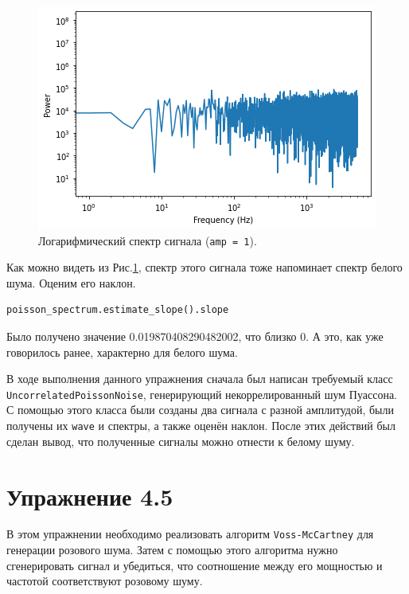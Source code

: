 \documentclass[a4paper, 14pt]{extarticle}
\begin{document}
    \begin{figure}[h]
        \centering
        \includegraphics[width=0.8\linewidth]{resources/Images/task4_large_spectrum_log}
        \caption{Логарифмический спектр сигнала (\texttt{amp = 1}).}
        \label{fig:task4_large_spectrum_log}
    \end{figure}

    Как можно видеть из Рис.\ref{fig:task4_large_spectrum_log}, спектр этого сигнала тоже напоминает спектр белого
    шума. Оценим его наклон.

    \begin{lstlisting}[caption= Вычисление наклона \texttt{(amp = 1)}., label={lst:task4_large_slope}]
poisson_spectrum.estimate_slope().slope \end{lstlisting}

    Было получено значение 0.019870408290482002, что близко 0. А это, как уже говорилось ранее, характерно для белого шума.

    В ходе выполнения данного упражнения сначала был написан требуемый класс \texttt{UncorrelatedPoissonNoise}, генерирующий
    некоррелированный шум Пуассона. С помощью этого класса были созданы два сигнала с разной амплитудой, были получены
    их \texttt{wave} и спектры, а также оценён наклон. После этих действий был сделан вывод, что полученные сигналы
    можно отнести к белому шуму.

    \newpage

    \section{Упражнение 4.5}
    \label{sec:task5}

    В этом упражнении необходимо реализовать алгоритм \texttt{Voss-McCartney} для генерации розового шума.
    Затем с помощью этого алгоритма нужно сгенерировать сигнал и убедиться, что соотношение между его мощностью
    и частотой соответствуют розовому шуму.
\end{document}
